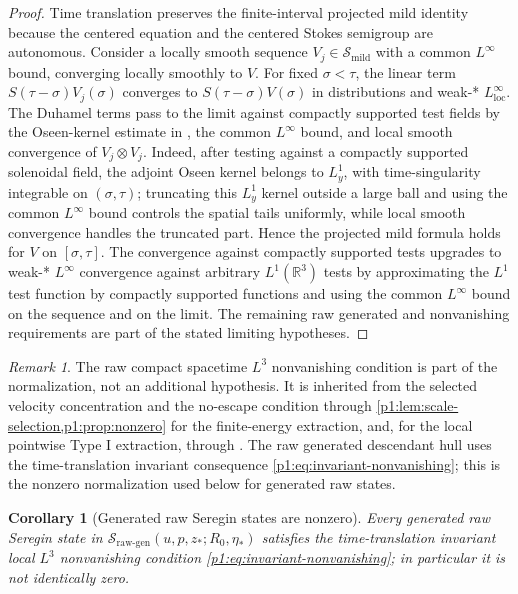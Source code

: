 \documentclass[11pt]{amsart}
\theoremstyle{plain}
\newtheorem{corollary}[corollary]{Corollary}
\theoremstyle{definition}
\theoremstyle{remark}
\newtheorem{remark}[remark]{Remark}
\numberwithin{equation}{section}
\newcommand{\R}{\mathbb R}
\newcommand{\loc}{\mathrm{loc}}
\newcommand{\calS}{\mathcal S}
\begin{document}
\begin{proof}
Time translation preserves the finite-interval projected mild identity because
the centered equation and the centered Stokes semigroup are autonomous.
Consider a locally smooth sequence \(V_j\in\calS_{\mathrm{mild}}\) with a common
\(L^\infty\) bound, converging locally smoothly to \(V\).  For fixed
\(\sigma<\tau\), the linear term \(S(\tau-\sigma)V_j(\sigma)\) converges to
\(S(\tau-\sigma)V(\sigma)\) in distributions and weak-* \(L^\infty_{\loc}\).
The Duhamel terms pass to the limit against compactly supported test fields by
the Oseen-kernel estimate in , the common
\(L^\infty\) bound, and local smooth convergence of \(V_j\otimes V_j\).  Indeed,
after testing against a compactly supported solenoidal field, the adjoint
Oseen kernel belongs to \(L^1_y\), with time-singularity integrable on
\((\sigma,\tau)\); truncating this \(L^1_y\) kernel outside a large ball and
using the common \(L^\infty\) bound controls the spatial tails uniformly,
while local smooth convergence handles the truncated part.  Hence
the projected mild formula holds for \(V\) on \([\sigma,\tau]\).  The
convergence against compactly supported tests upgrades to weak-* \(L^\infty\)
convergence against arbitrary \(L^1(\R^3)\) tests by approximating the
\(L^1\) test function by compactly supported functions and using the common
\(L^\infty\) bound on the sequence and on the limit.  The remaining
raw generated and nonvanishing requirements are part of the stated limiting
hypotheses.
\end{proof}

\begin{remark}
The raw compact spacetime \(L^3\) nonvanishing condition is part of the
normalization, not an additional hypothesis.  It is inherited from the
selected velocity concentration and the no-escape condition through
\cref{p1:lem:scale-selection,p1:prop:nonzero} for the finite-energy extraction,
and, for the local pointwise Type I extraction, through
.
The raw generated descendant hull uses the
time-translation invariant consequence \eqref{p1:eq:invariant-nonvanishing};
this is the nonzero normalization used below for generated raw states.
\end{remark}

\begin{corollary}[Generated raw Seregin states are nonzero]
\label{p1:cor:normalized-nonzero}
Every generated raw Seregin state in
\(\calS_{\mathrm{raw\text{-}gen}}(u,p,z_*;R_0,\eta_*)\) satisfies the
time-translation invariant local \(L^3\) nonvanishing condition
\eqref{p1:eq:invariant-nonvanishing}; in particular it is not identically
zero.
\end{corollary}
\end{document}
